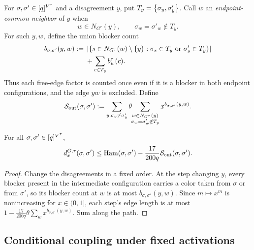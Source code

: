 For \(\sigma,\sigma'\in[q]^{V^\tau}\) and a disagreement \(y\), put
\(T_y=\left\{\sigma_y,\sigma'_y\right\}\).  Call \(w\) an
\emph{endpoint-common neighbor} of \(y\) when
\[
 w\in N_{G^\tau}(y),\qquad \sigma_w=\sigma'_w\notin T_y.
\]
For such \(y,w\), define the union blocker count
\[
\begin{aligned}
b_{\sigma,\sigma'}(y,w)
 :={}&\left|\left\{s\in N_{G^\tau}(w)\setminus\left\{y\right\}:
          \sigma_s\in T_y\ \text{or}\ \sigma'_s\in T_y\right\}\right|\\
 &+\sum_{c\in T_y}b_w^\tau(c).
\end{aligned}
\]
Thus each free-edge factor is counted once even if it is a blocker in
both endpoint configurations, and the edge \(yw\) is excluded.  Define
\begin{equation}\label{eq:cv-output-score}
 \mathcal S_{\rm out}(\sigma,\sigma')
 :=\sum_{y:\sigma_y\ne\sigma'_y}
      \theta\!\!\sum_{\substack{w\in N_{G^\tau}(y)\\
                 \sigma_w=\sigma'_w\notin T_y}}
        x^{b_{\sigma,\sigma'}(y,w)} .
\end{equation}

\begin{lemma}\label{lem:cv-path}
For all \(\sigma,\sigma'\in[q]^{V^\tau}\),
\begin{equation}\label{eq:cv-path}
  d_x^{G,\tau}(\sigma,\sigma')\le\operatorname{Ham}(\sigma,\sigma')
   -\frac{17}{200q}\mathcal S_{\rm out}(\sigma,\sigma').
\end{equation}
\end{lemma}

\begin{proof}
Change the disagreements in a fixed order. At the step changing $y$, every
blocker present in the intermediate configuration carries a color taken
from $\sigma$ or from $\sigma'$, so its blocker count at $w$ is at most
$b_{\sigma,\sigma'}(y,w)$.  Since $m\mapsto x^m$ is nonincreasing for
$x\in(0,1]$, each step's edge length is at most
$1-\tfrac{17}{200q}\theta\sum_wx^{b_{\sigma,\sigma'}(y,w)}$. Sum along the
path.
\end{proof}

\subsection{Conditional coupling under fixed activations}

